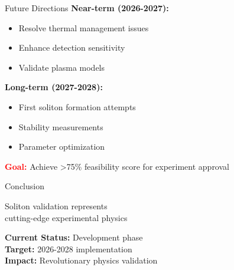 \documentclass[aspectratio=169,xcolor={table,dvipsnames}]{beamer}
\newcommand{\highlight}[1]{\textcolor{red}{\textbf{#1}}}
\begin{document}
\begin{frame}{Future Directions}
    \textbf{Near-term (2026-2027):}
    \begin{itemize}
        \item Resolve thermal management issues
        \item Enhance detection sensitivity
        \item Validate plasma models
    \end{itemize}
    
    \textbf{Long-term (2027-2028):}
    \begin{itemize}
        \item First soliton formation attempts
        \item Stability measurements
        \item Parameter optimization
    \end{itemize}
    
    \vspace{0.3cm}
    \highlight{Goal:} Achieve >75\% feasibility score for experiment approval
\end{frame}

\begin{frame}{Conclusion}
    \begin{center}
        \Large
        Soliton validation represents\\
        cutting-edge experimental physics
        
        \vspace{1cm}
        \normalsize
        \textbf{Current Status:} Development phase\\
        \textbf{Target:} 2026-2028 implementation\\
        \textbf{Impact:} Revolutionary physics validation
    \end{center}
\end{frame}

\begin{frame}
    \begin{center}
        \Huge Thank You!
        
        \vspace{1cm}
        \Large Questions and Discussion
    \end{center>
\end{frame}
\end{document}
